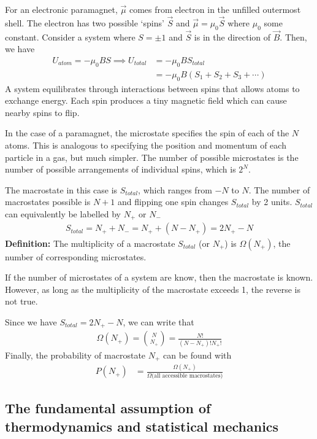 \documentclass[11pt]{article}
\begin{document}
For an electronic paramagnet, $\Vec{\mu}$ comes from electron in the unfilled outermost shell. The electron has two possible `spins' $\Vec{S}$ and $\Vec{\mu} = \mu_0 \Vec{S}$ where $\mu_0$ some constant. Consider a system where $S = \pm 1$ and $\Vec{S}$ is in the direction of $\Vec{B}$. Then, we have
\begin{align*}
    U_{atom} = -\mu_0 BS \implies U_{total} &= -\mu_0BS_{total} \\
    &= -\mu_0 B(S_1+ S_2 + S_3 + \cdots)
\end{align*}
A system equilibrates through interactions between spins that allows atoms to exchange energy. Each spin produces a tiny magnetic field which can cause nearby spins to flip. 

In the case of a paramagnet, the microstate specifies the spin of each of the $N$ atoms. This is analogous to specifying the position and momentum of each particle in a gas, but much simpler. The number of possible microstates is the number of possible arrangements of individual spins, which is $2^N$. 

The macrostate in this case is $S_{total}$, which ranges from $-N$ to $N$. The number of macrostates possible is $N+1$ and flipping one spin changes $S_{total}$ by 2 units. $S_{total}$ can equivalently be labelled by $N_+$ or $N_-$
\begin{align*}
    S_{total} = N_+ + N_- = N_+ + (N - N_+) = 2N_+ - N
\end{align*}
\textbf{Definition:} The multiplicity of a macrostate $S_{total}$ (or $N_+$) is $\Omega(N_+)$, the number of corresponding microstates. 

If the number of microstates of a system are know, then the macrostate is known. However, as long as the multiplicity of the macrostate exceeds 1, the reverse is not true. 

Since we have $S_{total} = 2N_+ - N$, we can write that 
\begin{align*}
    \Omega(N_+) = {N \choose N_+} = \frac{N!}{(N-N_+)!N_+!}
\end{align*}
Finally, the probability of macrostate $N_+$ can be found with
\begin{align*}
    P(N_+) &= \frac{\Omega(N_+)}{\Omega(\text{all accessible macrostates)}}
\end{align*}

\subsection{The fundamental assumption of thermodynamics and statistical mechanics}
\end{document}
